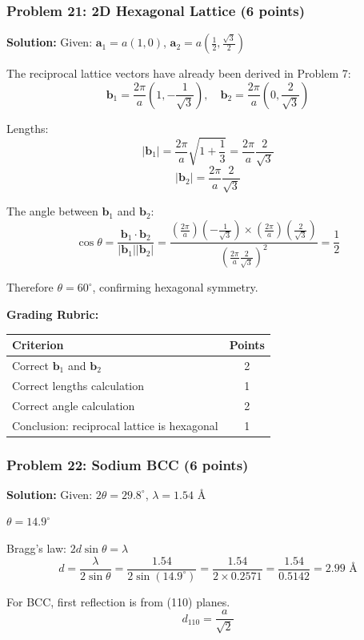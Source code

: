 \documentclass[12pt,a4paper]{article}
\begin{document}
\subsubsection*{Problem 21: 2D Hexagonal Lattice (6 points)}
\textbf{Solution:}
Given: $\mathbf{a}_1 = a(1,0)$, $\mathbf{a}_2 = a(\frac{1}{2}, \frac{\sqrt{3}}{2})$

The reciprocal lattice vectors have already been derived in Problem 7:
\[\mathbf{b}_1 = \frac{2\pi}{a}(1, -\frac{1}{\sqrt{3}}), \quad \mathbf{b}_2 = \frac{2\pi}{a}(0, \frac{2}{\sqrt{3}})\]

Lengths:
\[|\mathbf{b}_1| = \frac{2\pi}{a}\sqrt{1 + \frac{1}{3}} = \frac{2\pi}{a}\frac{2}{\sqrt{3}}\]
\[|\mathbf{b}_2| = \frac{2\pi}{a}\frac{2}{\sqrt{3}}\]

The angle between $\mathbf{b}_1$ and $\mathbf{b}_2$:
\[\cos\theta = \frac{\mathbf{b}_1 \cdot \mathbf{b}_2}{|\mathbf{b}_1||\mathbf{b}_2|} = \frac{(\frac{2\pi}{a})(-\frac{1}{\sqrt{3}}) \times (\frac{2\pi}{a})(\frac{2}{\sqrt{3}})}{(\frac{2\pi}{a}\frac{2}{\sqrt{3}})^2} = \frac{1}{2}\]

Therefore $\theta = 60^\circ$, confirming hexagonal symmetry.

\textbf{Grading Rubric:}
\begin{table}[h]
\centering
\begin{tabular}{|p{10cm}|c|}
\hline
\textbf{Criterion} & \textbf{Points} \\
\hline
Correct $\mathbf{b}_1$ and $\mathbf{b}_2$ & 2 \\
Correct lengths calculation & 1 \\
Correct angle calculation & 2 \\
Conclusion: reciprocal lattice is hexagonal & 1 \\
\hline
\end{tabular}
\end{table}

\subsubsection*{Problem 22: Sodium BCC (6 points)}
\textbf{Solution:}
Given: $2\theta = 29.8^\circ$, $\lambda = 1.54$ \AA

$\theta = 14.9^\circ$

Bragg's law: $2d\sin\theta = \lambda$
\[d = \frac{\lambda}{2\sin\theta} = \frac{1.54}{2\sin(14.9^\circ)} = \frac{1.54}{2 \times 0.2571} = \frac{1.54}{0.5142} = 2.99 \text{ \AA}\]

For BCC, first reflection is from (110) planes.
\[d_{110} = \frac{a}{\sqrt{2}}\]
\end{document}
